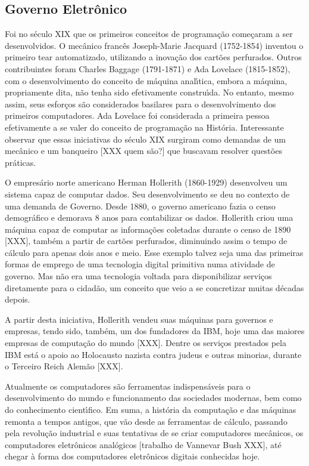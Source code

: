 \documentclass[
12pt,		%
openright,	%
twoside,  %
a4paper,			%
chapter=TITLE,		%
english,			%
french,				%
spanish,			%
brazil				%
]{USPSC-classe/USPSC}
\begin{document}
\subsection[Governo Eletr\^onico]{Governo Eletr\^onico}\label{Governo Eletr\^onico}
Foi no s\'eculo XIX que os primeiros conceitos de programa\c{c}\~ao come\c{c}aram a ser desenvolvidos. O mec\^anico franc\^es Joseph-Marie Jacquard (1752-1854) inventou o primeiro tear automatizado, utilizando a inova\c{c}\~ao dos cart\~oes perfurados. Outros contribuintes foram Charles Baggage (1791-1871) e Ada Lovelace (1815-1852), com o desenvolvimento do conceito de m\'aquina anal\'{\i}tica, embora a m\'aquina, propriamente dita, n\~ao tenha sido efetivamente constru\'{\i}da. No entanto, mesmo assim, seus esfor\c{c}os s\~ao considerados basilares para o desenvolvimento dos primeiros computadores. Ada Lovelace foi considerada a primeira pessoa efetivamente a se valer do conceito de programa\c{c}\~ao na Hist\'oria. Interessante observar que essas iniciativas do s\'eculo XIX surgiram como demandas de um mec\^anico e um banqueiro [XXX quem s\~ao?] que buscavam resolver quest\~oes pr\'aticas.


O empres\'ario norte americano Herman Hollerith (1860-1929) desenvolveu um sistema capaz de computar dados. Seu desenvolvimento se deu no contexto de uma demanda de Governo. Desde 1880, o governo americano fazia o censo demogr\'afico e demorava 8 anos para contabilizar os dados. Hollerith criou uma m\'aquina capaz de computar as informa\c{c}\~oes coletadas durante o censo de 1890 [XXX], tamb\'em a partir de cart\~oes perfurados, diminuindo assim o tempo de c\'alculo para apenas dois anos e meio. Esse exemplo talvez seja uma das primeiras formas de emprego de uma tecnologia digital primitiva numa atividade de governo. Mas n\~ao era uma tecnologia voltada para disponibilizar servi\c{c}os diretamente para o cidad\~ao, um conceito que veio a se concretizar muitas d\'ecadas depois.


A partir desta iniciativa, Hollerith vendeu suas m\'aquinas para governos e empresas, tendo sido, tamb\'em, um dos fundadores da IBM, hoje uma das maiores empresas de computa\c{c}\~ao do mundo [XXX]. Dentre os servi\c{c}os prestados pela IBM est\'a o apoio ao Holocausto nazista contra judeus e outras minorias, durante o Terceiro Reich Alem\~ao [XXX].


Atualmente os computadores s\~ao ferramentas indispens\'aveis para o desenvolvimento do mundo e funcionamento das sociedades modernas, bem como do conhecimento cient\'{\i}fico. Em suma, a hist\'oria da computa\c{c}\~ao e das m\'aquinas remonta a tempos antigos, que v\~ao desde as ferramentas de c\'alculo, passando pela revolu\c{c}\~ao industrial e suas tentativas de se criar computadores mec\^anicos, os computadores eletr\^onicos anal\'ogicos [trabalho de Vannevar Bush XXX], at\'e chegar \`a forma dos computadores eletr\^onicos digitais conhecidas hoje.
\end{document}
